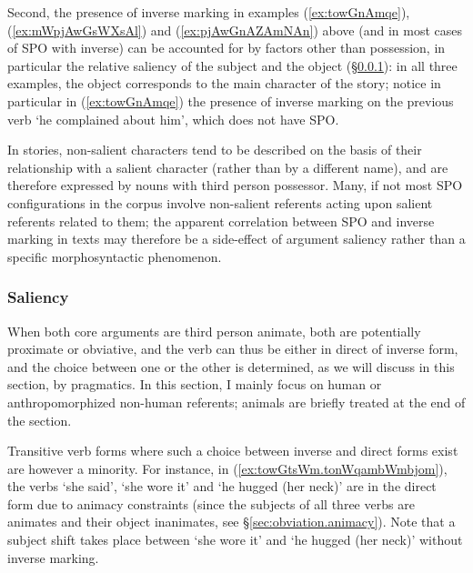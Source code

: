 Second, the presence of inverse marking in examples (\ref{ex:towGnAmqe}), (\ref{ex:mWpjAwGsWXsAl}) and (\ref{ex:pjAwGnAZAmNAn}) above (and in most cases of SPO with inverse) can be accounted for by factors other than possession, in particular the relative saliency of the subject and the object (§\ref{sec:obviation.saliency}): in all three examples, the object corresponds to the main character of the story; notice in particular in (\ref{ex:towGnAmqe}) the presence of inverse marking on the previous verb  `he complained about him', which does not have SPO. 

In stories, non-salient characters tend to be described on the basis of their relationship with a salient character (rather than by a different name), and are therefore expressed by nouns with third person possessor. Many, if not most SPO configurations in the corpus involve non-salient referents acting upon salient referents related to them; the apparent correlation between SPO and inverse marking in texts may therefore be a side-effect of argument saliency rather than a specific morphosyntactic phenomenon.


\subsubsection{Saliency}  \label{sec:obviation.saliency}
 
When both core arguments are third person animate, both are potentially proximate or obviative, and the verb can thus be either in direct of inverse form, and the choice between one or the other is determined, as we will discuss in this section, by pragmatics. In this section, I mainly focus on human or anthropomorphized non-human referents; animals are briefly treated at the end of the section.

Transitive verb forms where such a choice between inverse and direct forms exist are however a minority. For instance, in  (\ref{ex:towGtsWm.tonWqambWmbjom}), the verbs  `she said',  `she wore it' and  `he hugged (her neck)' are in the direct form due to animacy constraints (since the subjects of all three verbs are animates and their object inanimates, see §\ref{sec:obviation.animacy}). Note that a subject shift takes place between   `she wore it' and  `he hugged (her neck)' without inverse marking.

